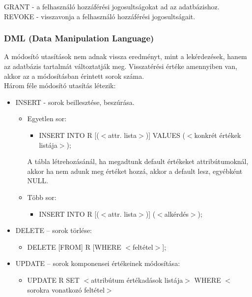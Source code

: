 \documentclass[tikz,12pt,margin=0px]{article}
\begin{document}
    \noindent GRANT - a felhasználó hozzáférési jogosultságokat ad az adatbázishoz.\\
    \noindent REVOKE - visszavonja a felhasználó hozzáférési jogosultságait.\\
	
	\subsubsection*{DML (Data Manipulation Language)}
	
    \noindent A módosító utasítások nem adnak vissza eredményt, mint a lekérdezések, hanem az adatbázis tartalmát változtatják meg. Visszatérési értéke amennyiben van, akkor az a módosításban érintett sorok száma.\\

    \noindent Három féle módosító utasítás létezik:
	\begin{itemize}
		\item INSERT - sorok beillesztése, beszúrása.
        \begin{itemize}
            \item Egyetlen sor:
            \begin{itemize}
                \item {\small INSERT INTO R [($<$attr. lista$>$)] VALUES ($<$konkrét értékek listája$>$);}
            \end{itemize}
                A tábla létrehozásánál, ha megadtunk default értékeket attribútumoknál, akkor ha nem adunk meg értéket hozzá, akkor a default lesz, egyébként NULL.
            \item Több sor:
            \begin{itemize}
                \item {\small INSERT INTO R [($<$attr. lista$>$)] ($<$alkérdés$>$);}
            \end{itemize}
        \end{itemize}
		\item DELETE – sorok törlése:
        \begin{itemize}
            \item {\small DELETE [FROM] R [WHERE $<$feltétel$>$];}
        \end{itemize}
		\item UPDATE – sorok komponensei értékeinek módosítása:
        \begin{itemize}
            \item {\small UPDATE R SET $<$attribútum értékadások listája$>$ WHERE $<$sorokra vonatkozó feltétel$>$}
        \end{itemize}
	\end{itemize}
\end{document}
